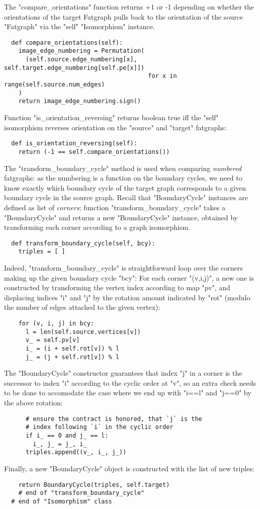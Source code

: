 The "compare_orientations" function returns +1 or -1 depending on
whether the orientations of the target Fatgraph pulls back to the
orientation of the source "Fatgraph" via the "self" "Isomorphism"
instance.
\begin{lstlisting}
  def compare_orientations(self):
    image_edge_numbering = Permutation(
      (self.source.edge_numbering[x], self.target.edge_numbering[self.pe[x]])
                                        for x in range(self.source.num_edges)
    )
    return image_edge_numbering.sign()

\end{lstlisting}

Function "is_orientation_reversing" returns boolean true iff the
"self" isomorphism reverses orientation on the "source" and "target"
fatgraphs: 
\begin{lstlisting}
  def is_orientation_reversing(self):
    return (-1 == self.compare_orientations())

\end{lstlisting}

The "transform_boundary_cycle" method is used when comparing
\emph{numbered} fatgraphs: as the numbering is a function on the
boundary cycles, we need to know exactly which boundary cycle of the
target graph corresponds to a given boundary cycle in the source
graph.  Recall that "BoundaryCycle" instances are defined as list of
\emph{corners}; function "transform_boundary_cycle" takes a
"BoundaryCycle" and returns a new "BoundaryCycle" instance, obtained
by transforming each corner according to a graph isomorphism.
\begin{lstlisting}
  def transform_boundary_cycle(self, bcy):
    triples = [ ]
\end{lstlisting}
Indeed, "transform_boundary_cycle" is straightforward loop over the
corners making up the given boundary cycle "bcy":
For each corner "(v,i,j)", a new one is constructed by transforming
the vertex index according to map "pv", and displacing indices "i" and
"j" by the rotation amount indicated by "rot" (modulo the number of
edges attached to the given vertex):
\begin{lstlisting}
    for (v, i, j) in bcy:
      l = len(self.source.vertices[v])
      v_ = self.pv[v]
      i_ = (i + self.rot[v]) % l
      j_ = (j + self.rot[v]) % l
\end{lstlisting}
The "BoundaryCycle" constructor guarantees that index "j" in
a corner is the successor to index "i" according to the cyclic order
at "v", so an extra check needs to be done to accomodate the case
where we end up with "i==l" and "j==0" by the above rotation:
\begin{lstlisting}
      # ensure the contract is honored, that `j` is the
      # index following `i` in the cyclic order
      if i_ == 0 and j_ == l:
        i_, j_ = j_, i_
      triples.append((v_, i_, j_))
\end{lstlisting}
Finally, a new "BoundaryCycle" object is constructed with the list of
new triples:
\begin{lstlisting}
    return BoundaryCycle(triples, self.target)
    # end of "transform_boundary_cycle"
  # end of "Isomorphism" class
\end{lstlisting}


